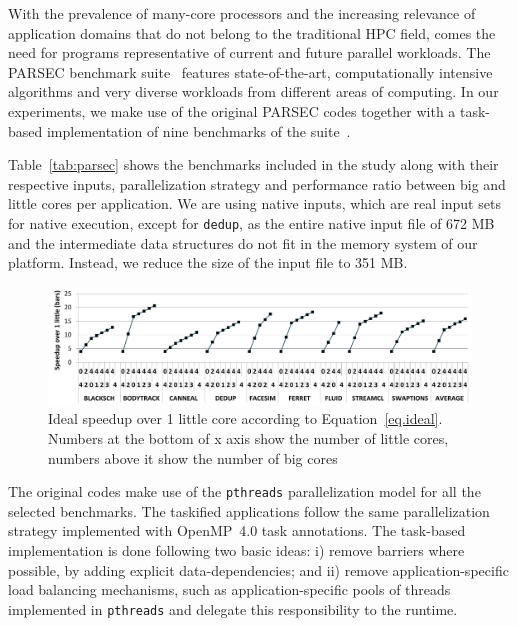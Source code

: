 With the prevalence of many-core processors and the increasing relevance of application 
domains that do not belong to the traditional HPC field, comes the need for programs 
representative of current and future parallel workloads. 
The PARSEC benchmark suite~\cite{PARSEC3,Bienia:PhD2011} features state-of-the-art, 
computationally intensive algorithms and very diverse workloads from different areas of computing.
In our experiments, we make use of the original PARSEC codes together with a task-based 
implementation of nine benchmarks of the suite~\cite{Chasapis:TACO2016}. 

Table~\ref{tab:parsec} shows the benchmarks included in the study along with their respective 
inputs, parallelization strategy and performance ratio between big and little cores per application. 
We are using native inputs, which are real input sets for native execution, except for \texttt{dedup}, as the entire native input file of 672 MB and the intermediate data structures do not fit in the memory system of our platform. 
Instead, we reduce the size of the input file to 351 MB.

\begin{figure}[t]%
	\centering
	\includegraphics[width=1\columnwidth]{figures/ideal_speedup_new.pdf}
	\caption{Ideal speedup over 1 little core according to Equation~\ref{eq.ideal}. Numbers at the bottom of x axis show the number of little cores, numbers above it show the number of big cores}
	\label{fig:ideal}%
\end{figure}

The original codes make use of the \texttt{pthreads} parallelization model for all the selected benchmarks. 
The taskified applications follow the same parallelization strategy implemented with OpenMP~4.0 task annotations.
The task-based implementation is done following two basic ideas: i) remove barriers where possible, by adding explicit data-dependencies; and ii) remove application-specific load balancing mechanisms, such as application-specific pools of threads implemented in \texttt{pthreads} and delegate this responsibility to the runtime.

